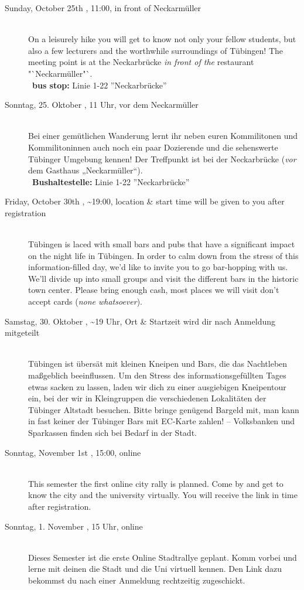 \begin{description}
\ifml
    \item[Sunday, October 25th \YEAR, 11:00, in front of Neckarmüller]\ \\
        On a leisurely hike you will get to know not only your fellow students, but also a few lecturers and the worthwhile surroundings of Tübingen! The meeting point is at the Neckarbrücke \emph{in front of the} restaurant "`Neckarmüller"`.\\
        ~\textbf{bus stop:} Linie 1-22 ''Neckarbrücke''
\else
    \item[Sonntag, 25. Oktober \YEAR, 11 Uhr, vor dem Neckarmüller]\ \\
        Bei einer gemütlichen Wanderung lernt ihr neben euren Kommilitonen und Kommilitoninnen auch noch ein paar Dozierende und die sehenswerte Tübinger Umgebung kennen! Der Treffpunkt ist bei der Neckarbrücke (\emph{vor} dem Gasthaus „Neckarmüller“).\\
	    ~\textbf{Bushaltestelle:} Linie 1-22 ''Neckarbrücke''
\fi

\ifml
	\item[Friday, October 30th \YEAR, \textasciitilde 19:00, \footnotesize{location \& start time will be given to you after registration}]\ \\
        Tübingen is laced with small bars and pubs that have a significant impact on the night life in Tübingen. In order to calm down from the stress of this information-filled day, we'd like to invite you to go bar-hopping with us. We'll divide up into small groups and visit the different bars in the historic town center. Please bring enough cash, most places we will visit don't accept cards (\emph{none whatsoever}).

\else
	\item[Samstag, 30. Oktober \YEAR, \textasciitilde 19 Uhr, \footnotesize{Ort \& Startzeit wird dir nach Anmeldung mitgeteilt}]\ \\
        Tübingen ist übersät mit kleinen Kneipen und Bars, die das Nachtleben maßgeblich beeinflussen. Um den Stress des informationsgefüllten Tages etwas sacken zu lassen, laden wir dich zu einer ausgiebigen Kneipentour ein, bei der wir in Kleingruppen die verschiedenen Lokalitäten der Tübinger Altstadt besuchen. Bitte bringe genügend Bargeld mit, man kann in fast keiner der Tübinger Bars mit EC-Karte zahlen! -- Volksbanken und Sparkassen finden sich bei Bedarf in der Stadt.
\fi

\ifml
    \item[Sonntag, November 1st \YEAR, 15:00, online]\ \\
        This semester the first online city rally is planned. Come by and get to know the city and the university virtually. You will receive the link in time after registration.
\else
    \item[Sonntag, 1. November \YEAR, 15 Uhr, online]\ \\
        Dieses Semester ist die erste Online Stadtrallye geplant. Komm vorbei und lerne mit deinen die Stadt und die Uni virtuell kennen. Den Link dazu bekommst du nach einer Anmeldung rechtzeitig zugeschickt.
\fi


\end{description}
